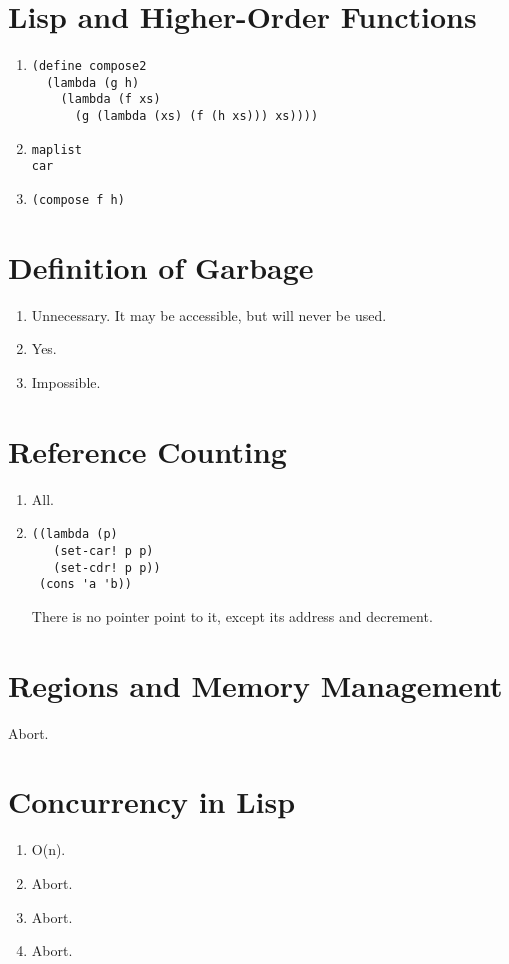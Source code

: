 \section{Lisp and Higher-Order Functions}
\begin{enumerate}
  \item
\begin{verbatim}
(define compose2
  (lambda (g h)
    (lambda (f xs)
      (g (lambda (xs) (f (h xs))) xs))))
\end{verbatim}

  \item
    \texttt{maplist} \\
    \texttt{car}

  \item
    \texttt{(compose f h)}
\end{enumerate}


\section{Definition of Garbage}
\begin{enumerate}
  \item Unnecessary. It may be accessible, but will never be used.
  \item Yes.
  \item Impossible. 
\end{enumerate}


\section{Reference Counting}
\begin{enumerate}
  \item All.
  \item
\begin{verbatim}
((lambda (p)
   (set-car! p p)
   (set-cdr! p p))
 (cons 'a 'b))
\end{verbatim}
    There is no pointer point to it, except its address and  decrement.
\end{enumerate}


\section{Regions and Memory Management}
Abort.

\section{Concurrency in Lisp}
\begin{enumerate}
  \item O(n).
  \item Abort.
  \item Abort.
  \item Abort.
\end{enumerate}
  
